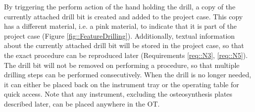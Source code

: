 By triggering the perform action of the hand holding the drill, a copy of the currently attached drill bit is created and added to the project case. 
This copy has a different material, i.e. a pink material, to indicate that it is part of the project case (Figure \ref{fig::FeatureDrilling}).
Additionally, textual information about the currently attached drill bit will be stored in the project case, so that the exact procedure can be reproduced later (Requirements \ref{req::N3}, \ref{req::N5}).
The drill bit will not be removed on performing a procedure, so that multiple drilling steps can be performed consecutively.
When the drill is no longer needed, it can either be placed back on the instrument tray or the operating table for quick access.
Note that any instrument, excluding the osteosynthesis plates described later, can be placed anywhere in the OT.